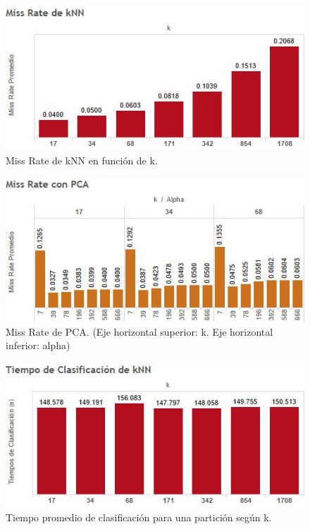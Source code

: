 \documentclass{article}
\begin{document}
\begin{figure}[H]
\centering
\includegraphics[scale=0.90]{MissRatedekNN.jpg}
\caption{Miss Rate de kNN en función de k.}
\label{fig:MissRatekNN}
\end{figure}

\begin{figure}[H]
\centering
\includegraphics[scale=0.90]{MissRatedePCA.jpg}
\caption{Miss Rate de PCA. (Eje horizontal superior: k. Eje horizontal inferior: alpha)}
\label{fig:MissRatePCA}
\end{figure}


\begin{figure}[H]
\centering
\includegraphics[scale=0.90]{TiempoClasificacionkNN.jpg}
\caption{Tiempo promedio de clasificación para una partición según k.}
\label{fig:TiempokNN}
\end{figure}
\end{document}
